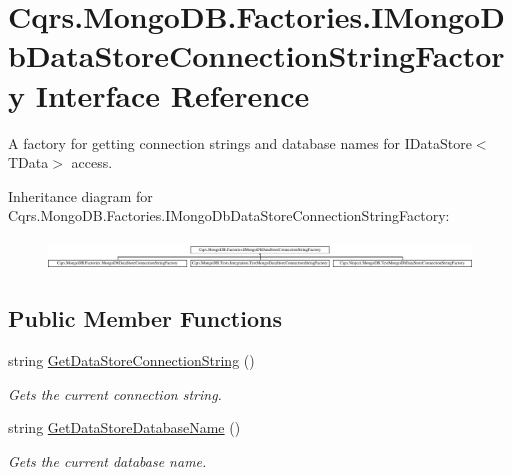 \hypertarget{interfaceCqrs_1_1MongoDB_1_1Factories_1_1IMongoDbDataStoreConnectionStringFactory}{}\section{Cqrs.\+Mongo\+D\+B.\+Factories.\+I\+Mongo\+Db\+Data\+Store\+Connection\+String\+Factory Interface Reference}
\label{interfaceCqrs_1_1MongoDB_1_1Factories_1_1IMongoDbDataStoreConnectionStringFactory}


A factory for getting connection strings and database names for I\+Data\+Store$<$\+T\+Data$>$ access.  


Inheritance diagram for Cqrs.\+Mongo\+D\+B.\+Factories.\+I\+Mongo\+Db\+Data\+Store\+Connection\+String\+Factory\+:\begin{figure}[H]
\begin{center}
\leavevmode
\includegraphics[height=0.802867cm]{interfaceCqrs_1_1MongoDB_1_1Factories_1_1IMongoDbDataStoreConnectionStringFactory}
\end{center}
\end{figure}
\subsection*{Public Member Functions}
\begin{DoxyCompactItemize}
\item 
string \hyperlink{interfaceCqrs_1_1MongoDB_1_1Factories_1_1IMongoDbDataStoreConnectionStringFactory_a31cb87fb2cf1435912f635394494ed91_a31cb87fb2cf1435912f635394494ed91}{Get\+Data\+Store\+Connection\+String} ()
\begin{DoxyCompactList}\small\item\em Gets the current connection string. \end{DoxyCompactList}\item 
string \hyperlink{interfaceCqrs_1_1MongoDB_1_1Factories_1_1IMongoDbDataStoreConnectionStringFactory_aca9921fae4214a9eb22a221825c57363_aca9921fae4214a9eb22a221825c57363}{Get\+Data\+Store\+Database\+Name} ()
\begin{DoxyCompactList}\small\item\em Gets the current database name. \end{DoxyCompactList}\end{DoxyCompactItemize}


